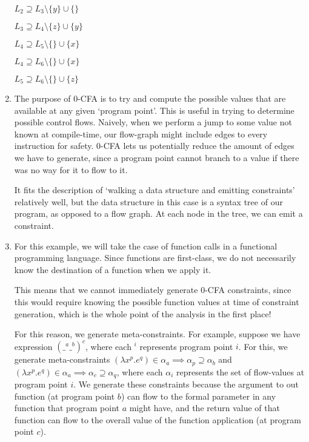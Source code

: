 \begin{enumerate}[label=(\alph*)]
    $L_2 \supseteq L_3 \setminus \{y\} \cup \{\}$

    $L_3 \supseteq L_4 \setminus \{z\} \cup \{y\}$

    $L_4 \supseteq L_5 \setminus \{\} \cup \{x\}$

    $L_4 \supseteq L_6 \setminus \{\} \cup \{x\}$

    $L_5 \supseteq L_6 \setminus \{\} \cup \{z\}$

  \item

    The purpose of 0-CFA is to try and compute the possible values that are available at any given `program point'. This is useful in trying to determine possible control flows. Naively, when we perform a jump to some value not known at compile-time, our flow-graph might include edges to every instruction for safety. 0-CFA lets us potentially reduce the amount of edges we have to generate, since a program point cannot branch to a value if there was no way for it to flow to it.

    It fits the description of `walking a data structure and emitting constraints' relatively well, but the data structure in this case is a syntax tree of our program, as opposed to a flow graph. At each node in the tree, we can emit a constraint.

  \item
    For this example, we will take the case of function calls in a functional programming language. Since functions are first-class, we do not necessarily know the destination of a function when we apply it.

    This means that we cannot immediately generate 0-CFA constraints, since this would require knowing the possible function values at time of constraint generation, which is the whole point of the analysis in the first place!

    For this reason, we generate meta-constraints. For example, suppose we have expression $(\_^a \_^b)^c$, where each $^i$ represents program point $i$. For this, we generate meta-constraints $(\lambda x^p. e^q) \in \alpha_a \implies \alpha_p \supseteq \alpha_b$ and $(\lambda x^p. e^q) \in \alpha_a \implies \alpha_c \supseteq \alpha_q$, where each $\alpha_i$ represents the set of flow-values at program point $i$. We generate these constraints because the argument to out function (at program point $b$) can flow to the formal parameter in any function that program point $a$ might have, and the return value of that function can flow to the overall value of the function application (at program point $c$).
    \end{enumerate}

